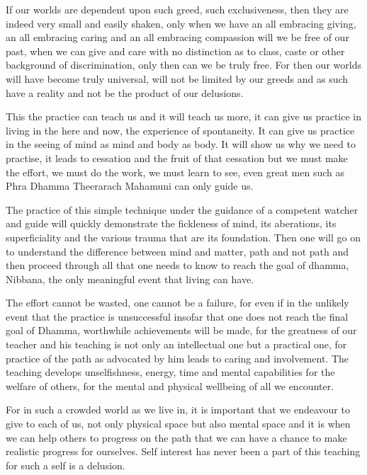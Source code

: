 \documentclass[a5paper,10pt,english]{book}
\begin{document}
\sphinxAtStartPar
If our worlds are dependent upon such greed, such exclusiveness, then they are indeed very small and easily shaken, only when we have an all embracing giving, an all embracing caring and an all embracing compassion will we be free of our past, when we can give and care with no distinction as to class, caste or other background of discrimination, only then can we be truly free. For then our worlds will have become truly universal, will not be limited by our greeds and as such have a reality and not be the product of our delusions.

\sphinxAtStartPar
This the practice can teach us and it will teach us more, it can give us practice in living in the here and now, the experience of spontaneity. It can give us practice in the seeing of mind as mind and body as body. It will show us why we need to practise, it leads to cessation and the fruit of that cessation but we must make the effort, we must do the work, we must learn to see, even great men such as Phra Dhamma Theerarach Mahamuni can only guide us.

\sphinxAtStartPar
The practice of this simple technique under the guidance of a competent watcher and guide will quickly demonstrate the fickleness of mind, its aberations, its superficiality and the various trauma that are its foundation. Then one will go on to understand the difference between mind and matter, path and not path and then proceed through all that one needs to know to reach the goal of dhamma, Nibbana, the only meaningful event that living can have.

\sphinxAtStartPar
The effort cannot be wasted, one cannot be a failure, for even if in the unlikely event that the practice is unsuccessful insofar that one does not reach the final goal of Dhamma, worthwhile achievements will be made, for the greatness of our teacher and his teaching is not only an intellectual one but a practical one, for practice of the path as advocated by him leads to caring and involvement. The teaching develops unselfishness, energy, time and mental capabilities for the welfare of others, for the mental and physical wellbeing of all we encounter.

\sphinxAtStartPar
For in such a crowded world as we live in, it is important that we endeavour to give to each of us, not only physical space but also mental space and it is when we can help others to progress on the path that we can have a chance to make realistic progress for ourselves. Self interest has never been a part of this teaching for such a self is a delusion.
\end{document}
